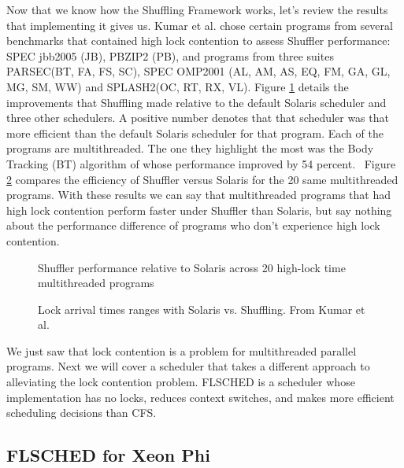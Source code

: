 \documentclass{sig-alternate}
\begin{document}
\vspace{1 mm}

Now that we know how the Shuffling Framework works, let's review the results that implementing it gives us. Kumar et al. chose certain programs from several benchmarks that contained high lock contention to assess Shuffler performance: SPEC jbb2005 (JB), PBZIP2 (PB), and programs from three suites PARSEC(BT, FA, FS, SC), SPEC OMP2001 (AL, AM, AS, EQ, FM, GA, GL, MG, SM, WW) and SPLASH2(OC, RT, RX, VL). Figure \ref{fig:shuf_performance} details the improvements that Shuffling made relative to the default Solaris scheduler and three other schedulers. A positive number denotes that that scheduler was that more efficient than the default Solaris scheduler for that program. Each of the programs are multithreaded. The one they highlight the most was the Body Tracking (BT) algorithm of whose performance improved by 54 percent.~\cite{Kumar:2014} Figure \ref{fig:shuf_vs_solaris} compares the efficiency of Shuffler versus Solaris for the 20 same multithreaded programs. With these results we can say that multithreaded programs that had high lock contention perform faster under Shuffler than Solaris, but say nothing about the performance difference of programs who don't experience high lock contention.
\begin{figure}
\centering
{}
\caption{Shuffler performance relative to Solaris across 20 high-lock time multithreaded programs~\cite{Kumar:2014}}
\label{fig:shuf_performance}
\end{figure}

\begin{figure}
\centering
{}
\caption{Lock arrival times ranges with Solaris vs. Shuffling. From Kumar et al.~\cite{Kumar:2014}}
\label{fig:shuf_vs_solaris}
\end{figure}

We just saw that lock contention is a problem for multithreaded parallel programs. Next we will cover a scheduler that takes a different approach to alleviating the lock contention problem. FLSCHED is a scheduler whose implementation has no locks, reduces context switches, and makes more efficient scheduling decisions than CFS.~\cite{Jo:2017}

\subsection{FLSCHED for Xeon Phi}
\label{sec:flsched}
\end{document}
